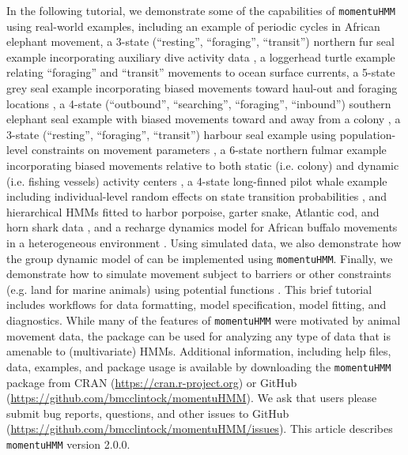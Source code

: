 \documentclass[12pt]{article}\usepackage[]{graphicx}\usepackage[]{xcolor}
\begin{document}
In the following tutorial, we demonstrate some of the capabilities of \verb|momentuHMM| using real-world examples, including an example of periodic cycles in African elephant movement, a 3-state (``resting'', ``foraging'', ``transit'') northern fur seal example incorporating auxiliary dive activity data \citep{McClintockEtAl2014b}, a loggerhead turtle example relating ``foraging'' and ``transit'' movements to ocean surface currents, a 5-state grey seal example incorporating biased movements toward haul-out and foraging locations \citep{McClintockEtAl2012}, a 4-state (``outbound'', ``searching'', ``foraging'', ``inbound'') southern elephant seal example with biased movements toward and away from a colony \citep{MichelotEtAl2017}, a 3-state (``resting'', ``foraging'', ``transit'') harbour seal example using population-level constraints on movement parameters \citep{McClintockEtAl2013c}, a 6-state northern fulmar example incorporating biased movements relative to both static (i.e. colony) and dynamic (i.e. fishing vessels) activity centers \citep{PirottaEtAl2018}, a 4-state long-finned pilot whale example including individual-level random effects on state transition probabilities \citep{IsojunnoEtAl2017}, and hierarchical HMMs fitted to harbor porpoise, garter snake, Atlantic cod, and horn shark data \citep{Leos-BarajasEtAl2017,AdamEtAl2019}, and a recharge dynamics model for African buffalo movements in a heterogeneous environment \citep{HootenEtAl2019}. Using simulated data, we also demonstrate how the group dynamic model of \cite{LangrockEtAl2014} can be implemented using \verb|momentuHMM|. Finally, we demonstrate how to simulate movement subject to barriers or other constraints (e.g. land for marine animals) using potential functions \citep[e.g.][]{BrillingerEtAl2012}. This brief tutorial includes workflows for data formatting, model specification, model fitting, and diagnostics. While many of the features of \verb|momentuHMM| were motivated by animal movement data, the package can be used for analyzing any type of data that is amenable to (multivariate) HMMs.  Additional information, including help files, data, examples, and package usage is available by downloading the \verb|momentuHMM| package from CRAN (\url{https://cran.r-project.org}) or GitHub (\url{https://github.com/bmcclintock/momentuHMM}). We ask that users please submit bug reports, questions, and other issues to GitHub (\url{https://github.com/bmcclintock/momentuHMM/issues}). This article describes \verb|momentuHMM| version 2.0.0.
\end{document}
